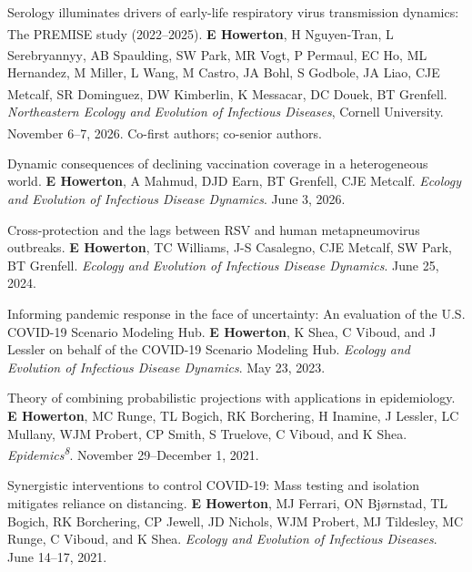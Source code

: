 \begin{cvnumbered}
  \item Serology illuminates drivers of early-life respiratory virus transmission dynamics: The PREMISE study (2022--2025). \textbf{E Howerton\cvstar}, H Nguyen-Tran\textsuperscript{\dag}, L Serebryannyy\textsuperscript{\dag}, AB Spaulding, SW Park, MR Vogt, P Permaul, EC Ho, ML Hernandez, M Miller, L Wang, M Castro, JA Bohl, S Godbole, JA Liao, CJE Metcalf, SR Dominguez, DW Kimberlin, K Messacar\textsuperscript{\ddag}, DC Douek\textsuperscript{\ddag}, BT Grenfell. \textit{Northeastern Ecology and Evolution of Infectious Diseases}, Cornell University. November 6--7, 2026. \textsuperscript{\dag}Co-first authors; \textsuperscript{\ddag}co-senior authors.

  \item Dynamic consequences of declining vaccination coverage in a heterogeneous world. \textbf{E Howerton\cvstar}, A Mahmud, DJD Earn, BT Grenfell, CJE Metcalf. \textit{Ecology and Evolution of Infectious Disease Dynamics}. June 3, 2026.

  \item Cross-protection and the lags between RSV and human metapneumovirus outbreaks. \textbf{E Howerton\cvstar}, TC Williams, J-S Casalegno, CJE Metcalf, SW Park, BT Grenfell. \textit{Ecology and Evolution of Infectious Disease Dynamics}. June 25, 2024.

  \item Informing pandemic response in the face of uncertainty: An evaluation of the U.S. COVID-19 Scenario Modeling Hub. \textbf{E Howerton\cvstar}, K Shea, C Viboud, and J Lessler on behalf of the COVID-19 Scenario Modeling Hub. \textit{Ecology and Evolution of Infectious Disease Dynamics}. May 23, 2023.

  \item Theory of combining probabilistic projections with applications in epidemiology. \textbf{E Howerton\cvstar}, MC Runge, TL Bogich, RK Borchering, H Inamine, J Lessler, LC Mullany, WJM Probert, CP Smith, S Truelove, C Viboud, and K Shea. \textit{Epidemics\textsuperscript{8}}. November 29--December 1, 2021.

  \item {Synergistic interventions to control COVID-19: Mass testing and isolation mitigates reliance on distancing. \textbf{E Howerton\cvstar}, MJ Ferrari, ON Bjørnstad, TL Bogich, RK Borchering, CP Jewell, JD Nichols, WJM Probert, MJ Tildesley, MC Runge, C Viboud, and K Shea. \textit{Ecology and Evolution of Infectious Diseases}. June 14--17, 2021.}
\end{cvnumbered}
